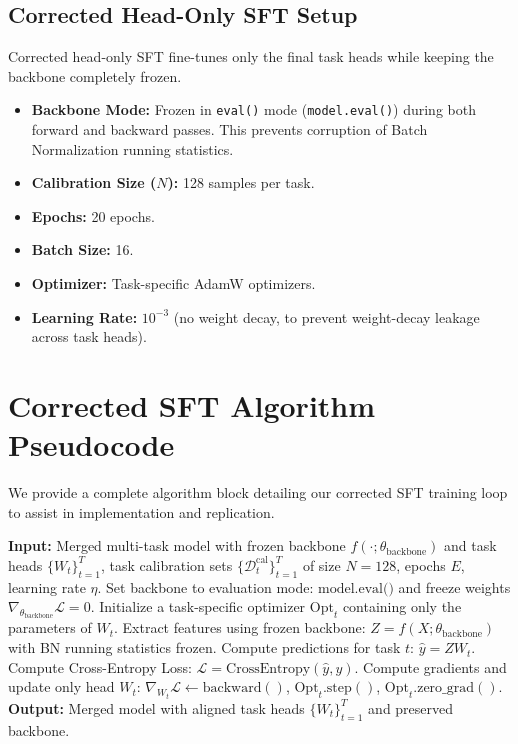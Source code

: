 \documentclass{article}
\theoremstyle{plain}
\theoremstyle{definition}
\theoremstyle{remark}
\begin{document}
\subsection{Corrected Head-Only SFT Setup}
Corrected head-only SFT fine-tunes only the final task heads while keeping the backbone completely frozen.
\begin{itemize}
  \item \textbf{Backbone Mode:} Frozen in \texttt{eval()} mode (\texttt{model.eval()}) during both forward and backward passes. This prevents corruption of Batch Normalization running statistics.
  \item \textbf{Calibration Size ($N$):} 128 samples per task.
  \item \textbf{Epochs:} 20 epochs.
  \item \textbf{Batch Size:} 16.
  \item \textbf{Optimizer:} Task-specific AdamW optimizers.
  \item \textbf{Learning Rate:} $10^{-3}$ (no weight decay, to prevent weight-decay leakage across task heads).
\end{itemize}

\section{Corrected SFT Algorithm Pseudocode}
\label{app:pseudocode}

We provide a complete algorithm block detailing our corrected SFT training loop to assist in implementation and replication. 

\begin{algorithm}[H]
\caption{Corrected Head-Only Supervised Fine-Tuning}
\label{alg:sft}
\begin{algorithmic}[1]
\STATE \textbf{Input:} Merged multi-task model with frozen backbone $f(\cdot; \theta_{\text{backbone}})$ and task heads $\{W_t\}_{t=1}^T$, task calibration sets $\{\mathcal{D}_t^{\text{cal}}\}_{t=1}^T$ of size $N=128$, epochs $E$, learning rate $\eta$.
\STATE Set backbone to evaluation mode: $\text{model.eval()}$ and freeze weights $\nabla_{\theta_{\text{backbone}}} \mathcal{L} = 0$.
    \STATE Initialize a task-specific optimizer $\text{Opt}_t$ containing only the parameters of $W_t$.
            \STATE Extract features using frozen backbone: $Z = f(X; \theta_{\text{backbone}})$ with BN running statistics frozen.
            \STATE Compute predictions for task $t$: $\hat{y} = Z W_t$.
            \STATE Compute Cross-Entropy Loss: $\mathcal{L} = \text{CrossEntropy}(\hat{y}, y)$.
            \STATE Compute gradients and update only head $W_t$:
            \STATE $\nabla_{W_t} \mathcal{L} \gets \text{backward}()$, $\text{Opt}_t.\text{step}()$, $\text{Opt}_t.\text{zero\_grad}()$.
        \ENDFOR
    \ENDFOR
\ENDFOR
\STATE \textbf{Output:} Merged model with aligned task heads $\{W_t\}_{t=1}^T$ and preserved backbone.
\end{algorithmic}
\end{algorithm}
\end{document}
